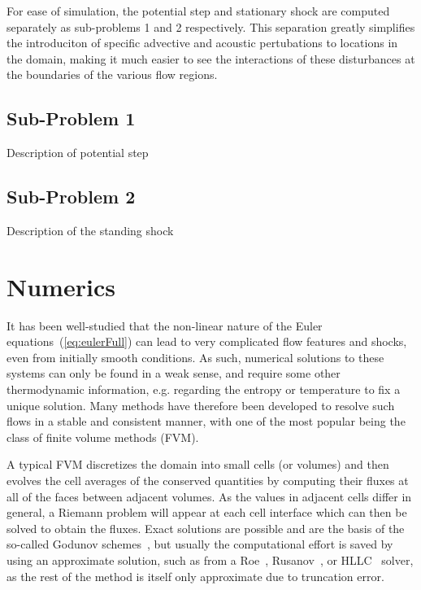 For ease of simulation, the potential step and stationary shock are computed separately as sub-problems 1 and 2 respectively. This separation greatly simplifies the introduciton of specific advective and acoustic pertubations to locations in the domain, making it much easier to see the interactions of these disturbances at the boundaries of the various flow regions.


\subsection{Sub-Problem 1}

Description of potential step

\subsection{Sub-Problem 2}

Description of the standing shock


\section{Numerics}
\label{sec:numerics}

It has been well-studied that the non-linear nature of the Euler equations~(\ref{eq:eulerFull}) can lead to very complicated flow features and shocks, even from initially smooth conditions. As such, numerical solutions to these systems can only be found in a weak sense, and require some other thermodynamic information, e.g. regarding the entropy or temperature to fix a unique solution. Many methods have therefore been developed to resolve such flows in a stable and consistent manner, with one of the most popular being the class of finite volume methods (FVM).

A typical FVM discretizes the domain into small cells (or volumes) and then evolves the cell averages of the conserved quantities by computing their fluxes at all of the faces between adjacent volumes. As the values in adjacent cells differ in general, a Riemann problem will appear at each cell interface which can then be solved to obtain the fluxes. Exact solutions are possible and are the basis of the so-called Godunov schemes~\cite{Godunov1959}, but usually the computational effort is saved by using an approximate solution, such as from a Roe~\cite{Roe1981}, Rusanov~\cite{Rusanov1961}, or HLLC~\cite{Toro1994} solver, as the rest of the method is itself only approximate due to truncation error.


